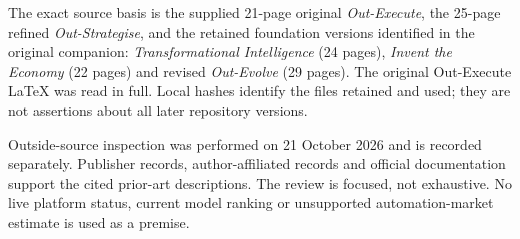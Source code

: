 \documentclass[11pt,letterpaper]{article}
\theoremstyle{definition}\newtheorem{definition}[theorem]{Definition}
\theoremstyle{remark}\newtheorem{remark}[theorem]{Remark}
\begin{document}
The exact source basis is the supplied 21-page original \emph{Out-Execute}, the 25-page refined \emph{Out-Strategise}, and the retained foundation versions identified in the original companion: \emph{Transformational Intelligence} (24 pages), \emph{Invent the Economy} (22 pages) and revised \emph{Out-Evolve} (29 pages). The original Out-Execute LaTeX was read in full. Local hashes identify the files retained and used; they are not assertions about all later repository versions.

Outside-source inspection was performed on 21 October 2026 and is recorded separately. Publisher records, author-affiliated records and official documentation support the cited prior-art descriptions. The review is focused, not exhaustive. No live platform status, current model ranking or unsupported automation-market estimate is used as a premise.
\end{document}
